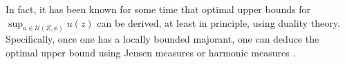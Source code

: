 \documentclass[11pt,reqno]{amsart}
\theoremstyle{plain}
\theoremstyle{definition}
\theoremstyle{remark}
\newcommand{\cU}{\mathcal{U}}
\begin{document}
In fact, it has been known for some time that optimal upper
bounds for $\sup_{u\in\cU(Z,\phi)}u(z)$ can be derived,
at least in principle, using duality theory.
Specifically, 
once one has a locally bounded majorant,  one can deduce the optimal upper bound using Jensen measures \cite[Corollary~1.7]{CR97} or  harmonic measures \cite[Theorem~1.3]{CR01}.







\end{document}
